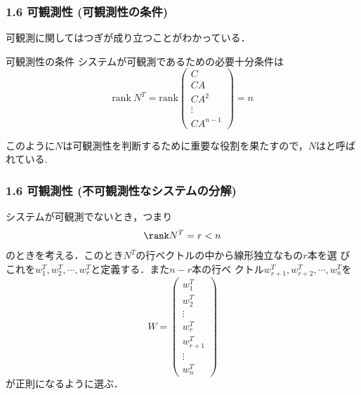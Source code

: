 \begin{frame}[t]
\frametitle{1.6 可観測性 (可観測性の条件)}
可観測に関してはつぎが成り立つことがわかっている．
\begin{block}{可観測性の条件}
システムが可観測であるための必要十分条件は
  $$\mbox{rank}\ N^T
  = \mbox{rank}
    \left(\begin{array}{c}
           C        \\
     C A      \\
     C A^2    \\
     \vdots   \\
     C A^{n-1}
    \end{array}\right)
  = n$$
\end{block}
このように$N$は可観測性を判断するために重要な役割を果たすので，$N$はと呼ばれている.
\end{frame}


\begin{frame}[t]
\frametitle{1.6 可観測性 (不可観測性なシステムの分解)}
システムが可観測でないとき，つまり
\begin{equation}
 \rank N^T = r < n
\end{equation}
のときを考える．このとき$N^T$の行ベクトルの中から線形独立なもの$r$本を選
びこれを$w_1^T, w_2^T, \cdots, w_r^T$と定義する．また$n-r$本の行ベ
クトル$w_{r+1}^T, w_{r+2}^T, \cdots, w_n^T$を
\begin{equation}
 W = \left(\begin{array}{c}
            w_1^T \\
      w_2^T \\
      \vdots \\
      w_r^T \\
      w_{r+1}^T \\
      \vdots \\
      w_n^T
     \end{array}\right)
\end{equation}
が正則になるように選ぶ．
\end{frame}


